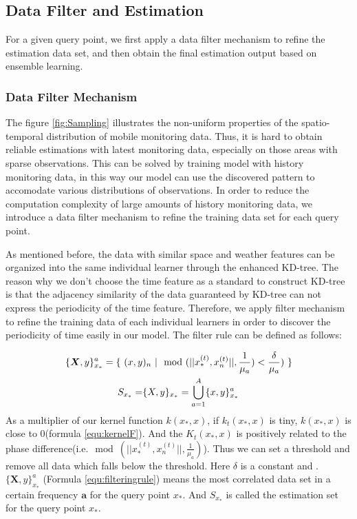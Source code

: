 \documentclass[twoside,leqno,twocolumn]{article}
\begin{document}
\subsection{Data Filter and Estimation}
For a given query point, we first apply a data filter mechanism to refine the estimation data set, and then obtain the final estimation output based on ensemble learning.
\subsubsection{Data Filter Mechanism}
The figure \ref{fig:Sampling} illustrates the non-uniform properties of the spatio-temporal distribution of mobile monitoring data. Thus, it is hard to obtain reliable estimations with latest monitoring data, especially on those areas with sparse observations. This can be solved by training model with history monitoring data, in this way our model can use the discovered pattern to accomodate various distributions of observations. In order to reduce the computation complexity of large amounts of history monitoring data, we introduce a data filter mechanism to refine the training data set for each query point.

As mentioned before, the data with similar space and weather features can be organized into the same individual learner through the enhanced KD-tree. The reason why we don't choose the time feature as a standard to construct KD-tree is that the adjacency similarity of the data guaranteed by KD-tree can not express the periodicity of the time feature. Therefore, we apply filter mechanism to refine the training data of each individual learners in order to discover the periodicity of time easily in our model. The filter rule can be defined as follows:

\begin{align}
\{ \bm{X}, y \}_{x_*}^a = \{~ (x, y&)_n ~ | \mod(||x_*^{(t)}, x_n^{(t)}||, \frac{1}{\mu_a}) < \frac{\delta}{\mu_a})~\} \label{equ:filteringrule} \\
S_{x_*} =& \{ X, y\}_{x_*} = \bigcup_{a=1}^A\{x, y\}_{x_*}^a \notag
\end{align}
As a multiplier of our kernel function $k(x_*, x)$, if $k_t(x_*, x)$ is tiny,  $k(x_*, x)$ is close to 0(formula \ref{equ:kernelF}). And the $K_t(x_*, x)$ is positively related to the phase difference(i.e.$\mod(||x_*^{(t)}, x_n^{(t)}||, \frac{1}{\mu_a})$). Thus we can set a threshold and remove all data which falls below the threshold. Here $\delta$ is a constant and . $\{\bm{X}, y\}_{x_*}^a$ (Formula \ref{equ:filteringrule}) means the most correlated data set in a certain frequency $\bm{a}$ for the query point $x_*$. And $S_{x_*}$ is called the estimation set for the query point $x_*$.
\end{document}
